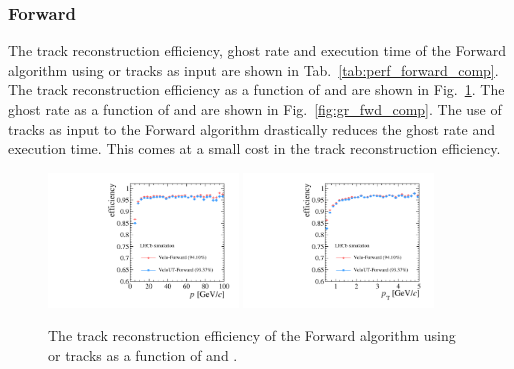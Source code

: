 \subsubsection{Forward}

The track reconstruction efficiency, ghost rate and execution time of the Forward algorithm using \velo or \velout tracks as input are shown in Tab.~\ref{tab:perf_forward_comp}. The track reconstruction efficiency as a function of \ptot and \pt are shown in Fig.~\ref{fig:eff_fwd_comp}. The ghost rate as a function of \ptot and \pt are shown in Fig.~\ref{fig:gr_fwd_comp}. The use of \velout tracks as input to the Forward algorithm drastically reduces the ghost rate and execution time. This comes at a small cost in the track reconstruction efficiency.

\begin{table}[!htb]
\caption{The performances of the Forward algorithm using \velo or \velout tracks as input in terms of track reconstruction efficiency, ghost rate and execution time.}
 \label{tab:perf_forward_comp}
\end{table}

\begin{figure}[!htb]
\centering
\includegraphics[width=0.45\textwidth]{figs/upstream-tracking-upgrade/fwd_eff_p_comp.pdf}
\includegraphics[width=0.45\textwidth]{figs/upstream-tracking-upgrade/fwd_eff_pt_comp.pdf}
\caption{The track reconstruction efficiency of the Forward algorithm using \velo or \velout tracks as a function of \ptot and \pt.}
\label{fig:eff_fwd_comp}
\end{figure}

